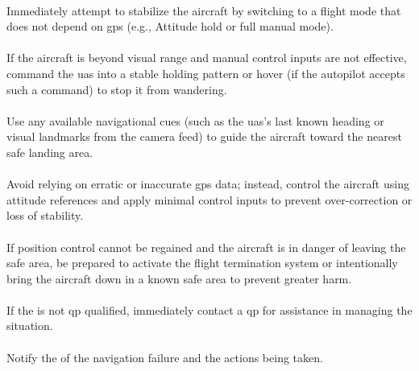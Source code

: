                 \paragraph{} Immediately attempt to stabilize the aircraft by switching to a flight mode that does not depend on \ac{gps} (e.g., Attitude hold or full manual mode).
                
                \paragraph{} If the aircraft is beyond visual range and manual control inputs are not effective, command the \ac{uas} into a stable holding pattern or hover (if the autopilot accepts such a command) to stop it from wandering.
                
                \paragraph{} Use any available navigational cues (such as the \ac{uas}’s last known heading or visual landmarks from the camera feed) to guide the aircraft toward the nearest safe landing area.
                
                \paragraph{} Avoid relying on erratic or inaccurate \ac{gps} data; instead, control the aircraft using attitude references and apply minimal control inputs to prevent over-correction or loss of stability.
                
                \paragraph{} If position control cannot be regained and the aircraft is in danger of leaving the safe area, be prepared to activate the flight termination system or intentionally bring the aircraft down in a known safe area to prevent greater harm.
                
                \paragraph{} If the  is not \ac{qp} qualified, immediately contact a \ac{qp} for assistance in managing the situation.
                
                \paragraph{} Notify the  of the navigation failure and the actions being taken.
                
